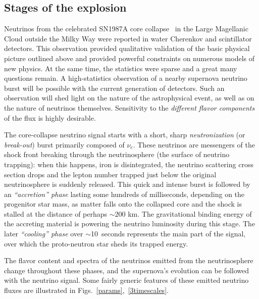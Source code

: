 \subsection{Stages of the explosion}

Neutrinos from the celebrated SN1987A core
collapse~\cite{Bionta:1987qt,Hirata:1987hu} in the Large Magellanic
Cloud outside the Milky Way were reported in water Cherenkov and
scintillator detectors. This observation provided qualitative validation of the basic physical picture outlined above and provided powerful constraints on numerous models of new physics. At the same time, the
statistics 
were sparse 
and a great many questions remain.  A high-statistics observation of a
nearby supernova neutrino burst will be possible with the current
generation of detectors. Such an observation will shed light
on 
the nature of the astrophysical event, as well as on the nature of
neutrinos themselves.  Sensitivity to the \textit{different flavor components}
of the flux is highly desirable.

The core-collapse neutrino signal starts with a short, sharp
\emph{neutronization} (or \emph{break-out}) burst primarily composed of
$\nu_e$. These neutrinos are messengers of the shock front breaking through the neutrinosphere (the surface of neutrino trapping): when this happens, iron is disintegrated, the neutrino scattering cross section drops and the lepton number trapped just below the original neutrinosphere is suddenly released. This quick and intense burst is followed by an
\emph{``accretion'' phase} lasting some hundreds of milliseconds, depending on the progenitor star mass, as matter falls onto the collapsed core and the shock is stalled at the distance of perhaps $\sim 200$ km. The gravitational binding energy of the accreting material is powering the neutrino luminosity during this stage. The later
\emph{``cooling'' phase} over $\sim$10~seconds represents the main part of
the signal, over which the proto-neutron star sheds its trapped energy.  

The flavor content and spectra of the neutrinos emitted from the neutrinosphere change
throughout these phases, and the supernova's evolution can
be followed with the neutrino signal. 
Some fairly generic features of these emitted neutrino fluxes are
illustrated in Figs.~\ref{params},~\ref{3timescales}.


